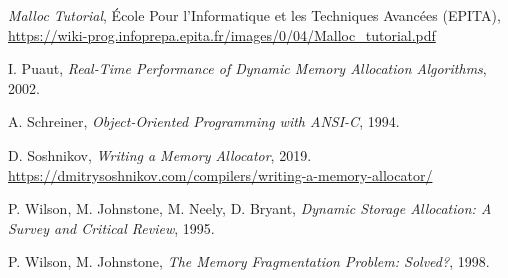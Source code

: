 \begin{thebibliography}{9}
  \emph{Malloc Tutorial}, École Pour l'Informatique et les Techniques Avancées (EPITA), \\
  \url{https://wiki-prog.infoprepa.epita.fr/images/0/04/Malloc_tutorial.pdf}

  I. Puaut, \emph{Real-Time Performance of Dynamic Memory Allocation Algorithms}, 2002.

  A. Schreiner, \emph{Object-Oriented Programming with ANSI-C}, 1994.

  D. Soshnikov, \emph{Writing a Memory Allocator}, 2019. \\
  \url{https://dmitrysoshnikov.com/compilers/writing-a-memory-allocator/}

  P. Wilson, M. Johnstone, M. Neely, D. Bryant, \emph{Dynamic Storage Allocation: A Survey and Critical Review}, 1995.

  P. Wilson, M. Johnstone, \emph{The Memory Fragmentation Problem: Solved?}, 1998.

\end{thebibliography}